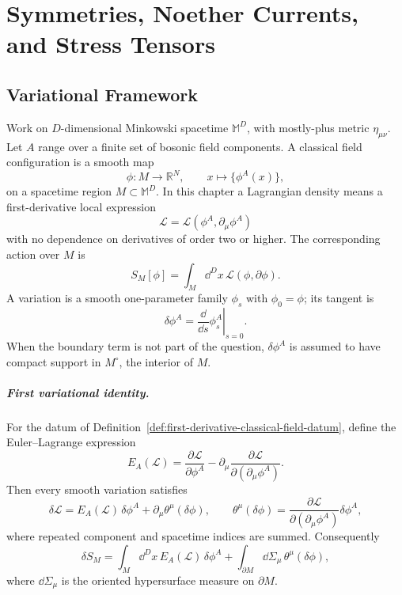 \chapter{Symmetries, Noether Currents, and Stress Tensors}
\label{ch:symmetries-noether-stress}
\ConventionsLorentzian


\section{Variational Framework}

\begin{definition}
\label{def:first-derivative-classical-field-datum}
Work on \(D\)-dimensional Minkowski spacetime \(\mathbb M^D\), with
mostly-plus metric \(\eta_{\mu\nu}\).  Let \(A\) range over a finite set of
bosonic field components.  A classical field configuration is a smooth map
\[
  \phi:M\longrightarrow \mathbb R^N,\qquad
  x\longmapsto \{\phi^A(x)\},
\]
on a spacetime region \(M\subset \mathbb M^D\).  In this chapter a Lagrangian
density means a first-derivative local expression
\[
  \mathcal L=\mathcal L(\phi^A,\partial_\mu\phi^A)
\]
with no dependence on derivatives of order two or higher.  The corresponding
action over \(M\) is
\[
  S_M[\phi]=\int_M\dd^Dx\,\mathcal L(\phi,\partial\phi).
\]
A variation is a smooth one-parameter family \(\phi_s\) with
\(\phi_0=\phi\); its tangent is
\[
  \delta\phi^A=\left.\frac{\dd}{\dd s}\phi_s^A\right|_{s=0}.
\]
When the boundary term is not part of the question, \(\delta\phi^A\) is
assumed to have compact support in \(M^\circ\), the interior of \(M\).
\end{definition}

\paragraph{First variational identity.}
For the datum of
Definition~\ref{def:first-derivative-classical-field-datum}, define the
Euler--Lagrange expression
\[
  E_A(\mathcal L)
  =
  \frac{\partial\mathcal L}{\partial\phi^A}
  -
  \partial_\mu
  \frac{\partial\mathcal L}{\partial(\partial_\mu\phi^A)} .
\]
Then every smooth variation satisfies
\[
  \delta\mathcal L
  =
  E_A(\mathcal L)\,\delta\phi^A
  +
  \partial_\mu\theta^\mu(\delta\phi),
  \qquad
  \theta^\mu(\delta\phi)
  =
  \frac{\partial\mathcal L}{\partial(\partial_\mu\phi^A)}
  \delta\phi^A ,
\]
where repeated component and spacetime indices are summed.  Consequently
\[
  \delta S_M
  =
  \int_M\dd^Dx\,E_A(\mathcal L)\,\delta\phi^A
  +
  \int_{\partial M}\dd\Sigma_\mu\,\theta^\mu(\delta\phi),
\]
where \(\dd\Sigma_\mu\) is the oriented hypersurface measure on
\(\partial M\).

